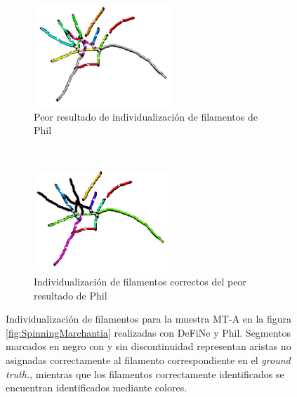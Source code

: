 \begin{figure}[t]
    \begin{subfigure}[t]{0.49\textwidth}
        \centering
        \includegraphics[height=1.5in]{resultImages/50-ROIs-Spinning-Marchantia-phil-s10-v05-antLabeled.png}
        \caption{Peor resultado de individualizaci\'on de filamentos de Phil}
        \label{SpinningMarchantiaResults-worstPhil}
    \end{subfigure}
    ~ 
    \begin{subfigure}[t]{0.49\textwidth}
        \centering
        \includegraphics[height=1.5in]{resultImages/50-ROIs-Spinning-Marchantia-phil-s10-v05-exactMatch-antLabeled.png}
        \caption{Individualizaci\'on de filamentos correctos del peor resultado de Phil}
        \label{fig:SpinningMarchantiaResults-worstPhilExact}
    \end{subfigure}
    
    \caption{Individualizaci\'on  de filamentos para la muestra MT-A en la figura \ref{fig:SpinningMarchantia} realizadas con DeFiNe y Phil. Segmentos marcados en negro con y sin discontinuidad representan aristas no asignadas correctamente al filamento correspondiente en el {\it ground truth.}, mientras que los filamentos correctamente identificados se encuentran identificados mediante colores.}
    \label{fig:SpinningMarchantiaResults}
\end{figure}

